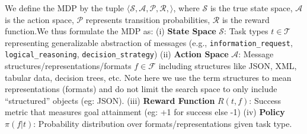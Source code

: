 We define the MDP by the tuple $\langle \mathcal{S}, \mathcal{A}, \mathcal{P}, \mathcal{R}, \rangle$, where $\mathcal{S}$ is the true state space, $\mathcal{A}$ is the action space, $\mathcal{P}$ represents transition probabilities, $\mathcal{R}$ is the reward function.We thus formulate the MDP as:
(i) \textbf{State Space} $\mathcal{S}$: Task types $t \in \mathcal{T}$ representing generalizable abstraction of messages (e.g., \texttt{information\_request}, \texttt{logical\_reasoning}, \texttt{decision\_strategy})
(ii) \textbf{Action Space} $\mathcal{A}$: Message structures/representations/formats $f \in \mathcal{F}$ including structures like JSON, XML, tabular data, decision trees, etc. Note here we use the term structures to mean representations (formats) and do not limit the search space to only include ``structured'' objects (eg: JSON).
(iii) \textbf{Reward Function} $R(t,f)$: Success metric that measures goal attainment (eg: +1 for success else -1)
(iv) \textbf{Policy} $\pi(f|t)$: Probability distribution over formats/representations given task type.

